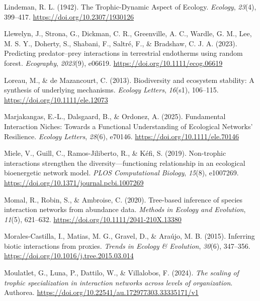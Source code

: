 \documentclass[
]{article}
\newlength{\cslhangindent}
\newenvironment{CSLReferences}[2] %
 {\begin{list}{}{%
  \setlength{\itemindent}{0pt}
  \setlength{\leftmargin}{0pt}
  \setlength{\parsep}{0pt}
  \ifodd #1
   \setlength{\leftmargin}{\cslhangindent}
   \setlength{\itemindent}{-1\cslhangindent}
  \fi
  \setlength{\itemsep}{#2\baselineskip}}}
 {\end{list}}
\begin{document}
\begin{CSLReferences}{1}{0}
Lindeman, R. L. (1942). The {Trophic-Dynamic Aspect} of {Ecology}.
\emph{Ecology}, \emph{23}(4), 399--417.
\url{https://doi.org/10.2307/1930126}

Llewelyn, J., Strona, G., Dickman, C. R., Greenville, A. C., Wardle, G.
M., Lee, M. S. Y., Doherty, S., Shabani, F., Saltré, F., \& Bradshaw, C.
J. A. (2023). Predicting predator--prey interactions in terrestrial
endotherms using random forest. \emph{Ecography}, \emph{2023}(9),
e06619. \url{https://doi.org/10.1111/ecog.06619}

Loreau, M., \& de Mazancourt, C. (2013). Biodiversity and ecosystem
stability: A synthesis of underlying mechanisms. \emph{Ecology Letters},
\emph{16}(s1), 106--115. \url{https://doi.org/10.1111/ele.12073}

Marjakangas, E.-L., Dalsgaard, B., \& Ordonez, A. (2025). Fundamental
{Interaction Niches}: {Towards} a {Functional Understanding} of
{Ecological Networks}' {Resilience}. \emph{Ecology Letters},
\emph{28}(6), e70146. \url{https://doi.org/10.1111/ele.70146}

Miele, V., Guill, C., Ramos-Jiliberto, R., \& Kéfi, S. (2019).
Non-trophic interactions strengthen the diversity---functioning
relationship in an ecological bioenergetic network model. \emph{PLOS
Computational Biology}, \emph{15}(8), e1007269.
\url{https://doi.org/10.1371/journal.pcbi.1007269}

Momal, R., Robin, S., \& Ambroise, C. (2020). Tree-based inference of
species interaction networks from abundance data. \emph{Methods in
Ecology and Evolution}, \emph{11}(5), 621--632.
\url{https://doi.org/10.1111/2041-210X.13380}

Morales-Castilla, I., Matias, M. G., Gravel, D., \& Araújo, M. B.
(2015). Inferring biotic interactions from proxies. \emph{Trends in
Ecology \& Evolution}, \emph{30}(6), 347--356.
\url{https://doi.org/10.1016/j.tree.2015.03.014}

Moulatlet, G., Luna, P., Dattilo, W., \& Villalobos, F. (2024).
\emph{The scaling of trophic specialization in interaction networks
across levels of organization}. Authorea.
\url{https://doi.org/10.22541/au.172977303.33335171/v1}


\end{CSLReferences}
\end{document}
